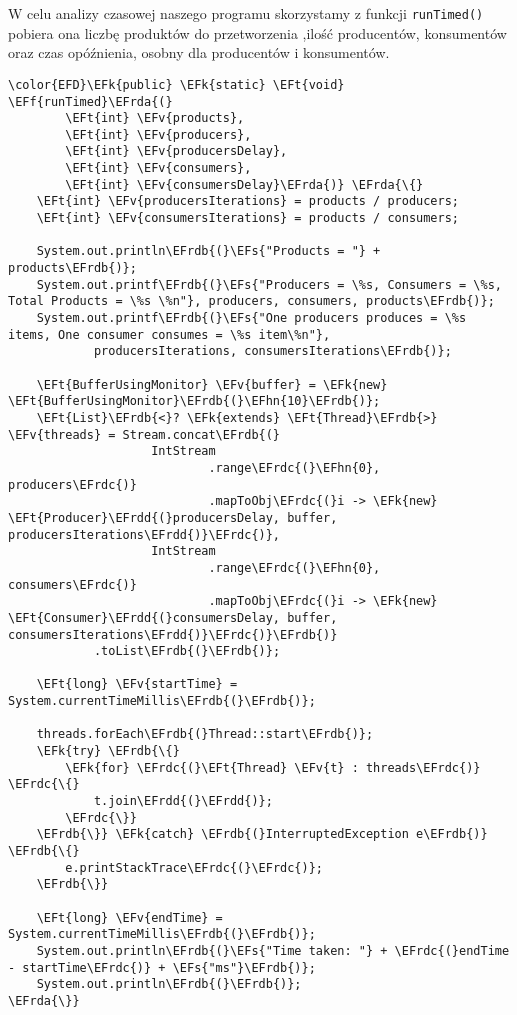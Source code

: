 \documentclass[11pt]{article}
\newcommand{\EFs}[1]{\textcolor{EFs}{#1}} %
\newcommand{\EFk}[1]{\textcolor{EFk}{#1}} %
\newcommand{\EFf}[1]{\textcolor{EFf}{#1}} %
\newcommand{\EFv}[1]{\textcolor{EFv}{#1}} %
\newcommand{\EFt}[1]{\textcolor{EFt}{#1}} %
\newcommand{\EFhn}[1]{\textcolor{EFhn}{#1}} %
\newcommand{\EFrda}[1]{#1} %
\newcommand{\EFrdb}[1]{\textcolor{EFrdb}{#1}} %
\newcommand{\EFrdc}[1]{\textcolor{EFrdc}{#1}} %
\newcommand{\EFrdd}[1]{\textcolor{EFrdd}{#1}} %
\begin{document}
W celu analizy czasowej naszego programu skorzystamy z funkcji \texttt{runTimed()}
pobiera ona liczbę produktów do przetworzenia ,ilość producentów, konsumentów
oraz czas opóźnienia, osobny dla producentów i konsumentów.
\newpage

\begin{Code}
\begin{Verbatim}
\color{EFD}\EFk{public} \EFk{static} \EFt{void} \EFf{runTimed}\EFrda{(}
        \EFt{int} \EFv{products},
        \EFt{int} \EFv{producers},
        \EFt{int} \EFv{producersDelay},
        \EFt{int} \EFv{consumers},
        \EFt{int} \EFv{consumersDelay}\EFrda{)} \EFrda{\{}
    \EFt{int} \EFv{producersIterations} = products / producers;
    \EFt{int} \EFv{consumersIterations} = products / consumers;

    System.out.println\EFrdb{(}\EFs{"Products = "} + products\EFrdb{)};
    System.out.printf\EFrdb{(}\EFs{"Producers = \%s, Consumers = \%s, Total Products = \%s \%n"}, producers, consumers, products\EFrdb{)};
    System.out.printf\EFrdb{(}\EFs{"One producers produces = \%s items, One consumer consumes = \%s item\%n"},
            producersIterations, consumersIterations\EFrdb{)};

    \EFt{BufferUsingMonitor} \EFv{buffer} = \EFk{new} \EFt{BufferUsingMonitor}\EFrdb{(}\EFhn{10}\EFrdb{)};
    \EFt{List}\EFrdb{<}? \EFk{extends} \EFt{Thread}\EFrdb{>} \EFv{threads} = Stream.concat\EFrdb{(}
                    IntStream
                            .range\EFrdc{(}\EFhn{0}, producers\EFrdc{)}
                            .mapToObj\EFrdc{(}i -> \EFk{new} \EFt{Producer}\EFrdd{(}producersDelay, buffer, producersIterations\EFrdd{)}\EFrdc{)},
                    IntStream
                            .range\EFrdc{(}\EFhn{0}, consumers\EFrdc{)}
                            .mapToObj\EFrdc{(}i -> \EFk{new} \EFt{Consumer}\EFrdd{(}consumersDelay, buffer, consumersIterations\EFrdd{)}\EFrdc{)}\EFrdb{)}
            .toList\EFrdb{(}\EFrdb{)};

    \EFt{long} \EFv{startTime} = System.currentTimeMillis\EFrdb{(}\EFrdb{)};

    threads.forEach\EFrdb{(}Thread::start\EFrdb{)};
    \EFk{try} \EFrdb{\{}
        \EFk{for} \EFrdc{(}\EFt{Thread} \EFv{t} : threads\EFrdc{)} \EFrdc{\{}
            t.join\EFrdd{(}\EFrdd{)};
        \EFrdc{\}}
    \EFrdb{\}} \EFk{catch} \EFrdb{(}InterruptedException e\EFrdb{)} \EFrdb{\{}
        e.printStackTrace\EFrdc{(}\EFrdc{)};
    \EFrdb{\}}

    \EFt{long} \EFv{endTime} = System.currentTimeMillis\EFrdb{(}\EFrdb{)};
    System.out.println\EFrdb{(}\EFs{"Time taken: "} + \EFrdc{(}endTime - startTime\EFrdc{)} + \EFs{"ms"}\EFrdb{)};
    System.out.println\EFrdb{(}\EFrdb{)};
\EFrda{\}}
\end{Verbatim}
\end{Code}
\end{document}
